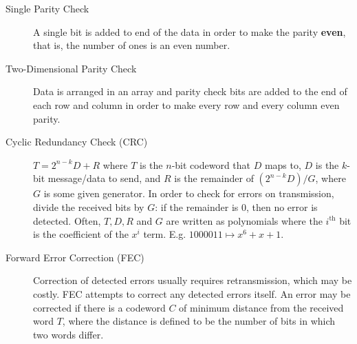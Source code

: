 \documentclass{article}
\begin{document}
\begin{description}
    \item[Single Parity Check] A single bit is added to end of the data in order to make the parity
    \textbf{even}, that is, the number of ones is an even number.
    
    \item[Two-Dimensional Parity Check] Data is arranged in an array and parity check bits are added
    to the end of each row and column in order to make every row and every column even parity.
    
    \item[Cyclic Redundancy Check (CRC)] $T=2^{n-k}D+R$ where $T$ is the $n$-bit codeword that $D$
    maps to, $D$ is the $k$-bit message/data to send, and $R$ is the remainder of $(2^{n-k}D)/G$, 
    where $G$ is some given generator. In order to check for errors on transmission, divide the received bits 
    by $G$: if the remainder is $0$, then no error is detected. Often, $T,D,R$ and $G$ are written 
    as polynomials where the $i^\text{th}$ bit is the coefficient of the $x^i$ term.
    E.g. $1000011\mapsto x^6+x+1.$ 
    
    \item[Forward Error Correction (FEC)] Correction of detected errors usually requires retransmission,
    which may be costly. FEC attempts to correct any detected errors itself. An error may be corrected
    if there is a codeword $C$ of minimum distance from the received word $T$, where the distance is
    defined to be the number of bits in which two words differ.
\end{description}
\end{document}
